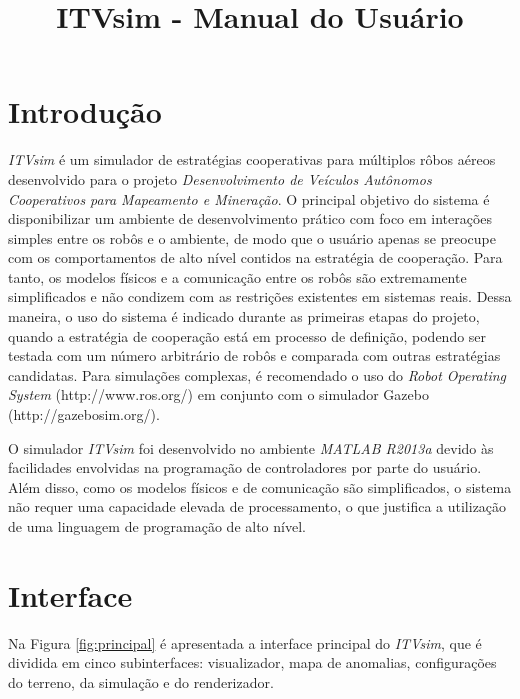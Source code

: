 \documentclass[11pt,a4paper]{article}
\title{ITVsim - Manual do Usuário}
\date{}
\begin{document}
\maketitle
\tableofcontents

\section{Introdução} 
\textit{ITVsim} é um simulador de estratégias cooperativas para
múltiplos rôbos aéreos desenvolvido para o projeto
\textit{Desenvolvimento de Veículos Autônomos Cooperativos para
  Mapeamento e Mineração}. O principal objetivo do sistema é
disponibilizar um ambiente de desenvolvimento prático com foco em
interações simples entre os robôs e o ambiente, de modo que o usuário
apenas se preocupe com os comportamentos de alto nível contidos na
estratégia de cooperação. Para tanto, os modelos físicos e a
comunicação entre os robôs são extremamente simplificados e não
condizem com as restrições existentes em sistemas reais. Dessa
maneira, o uso do sistema é indicado durante as primeiras etapas do
projeto, quando a estratégia de cooperação está em processo de
definição, podendo ser testada com um número arbitrário de robôs e
comparada com outras estratégias candidatas. Para simulações
complexas, é recomendado o uso do \textit{Robot Operating System}
(http://www.ros.org/) em conjunto com o simulador Gazebo
(http://gazebosim.org/).

O simulador \textit{ITVsim} foi desenvolvido no ambiente
\textit{MATLAB R2013a} devido às facilidades envolvidas na programação
de controladores por parte do usuário. Além disso, como os modelos
físicos e de comunicação são simplificados, o sistema não requer uma
capacidade elevada de processamento, o que justifica a utilização de
uma linguagem de programação de alto nível.


\section{Interface}
Na Figura \ref{fig:principal} é apresentada a interface principal do
\textit{ITVsim}, que é dividida em cinco subinterfaces: visualizador,
mapa de anomalias, configurações do terreno, da simulação e do
renderizador.
\end{document}
